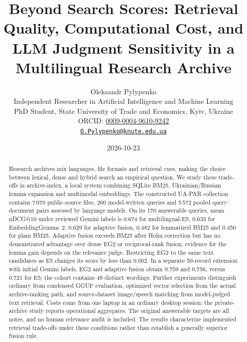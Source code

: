 \documentclass[11pt]{article}
\begin{document}

\title{Beyond Search Scores: Retrieval Quality, Computational Cost, and LLM Judgment Sensitivity in a Multilingual Research Archive}
\author{Oleksandr Pylypenko\\[2pt]\small Independent Researcher in Artificial Intelligence and Machine Learning\\ \small PhD Student, State University of Trade and Economics, Kyiv, Ukraine\\[2pt]
\small ORCID: \href{https://orcid.org/0009-0004-9610-9242}{0009-0004-9610-9242}\\ \small\href{mailto:O.Pylypenko@knute.edu.ua}{\texttt{O.Pylypenko@knute.edu.ua}}}
\date{2026-10-23}
\maketitle

\begin{abstract}
\noindent
Research archives mix languages, file formats and retrieval cues, making the choice between lexical, dense and hybrid search an empirical question. We study these trade-offs in archive-index, a local system combining SQLite BM25, Ukrainian/Russian lemma expansion and multimodal embeddings. The constructed UA-PAR collection contains 7\,070 public-source files, 200 model-written queries and 5\,572 pooled query--document pairs assessed by language models. On its 170 answerable queries, mean nDCG@10 under reviewed Gemini labels is 0.674 for multilingual-E5, 0.633 for EmbeddingGemma~2, 0.629 for adaptive fusion, 0.482 for lemmatized BM25 and 0.450 for plain BM25. Adaptive fusion exceeds BM25 after Holm correction but has no demonstrated advantage over dense EG2 or reciprocal-rank fusion; evidence for the lemma gain depends on the relevance judge. Restricting EG2 to the same text candidates as E5 changes its score by less than 0.002. In a separate 50-record extension with initial Gemini labels, EG2 and adaptive fusion obtain 0.759 and 0.756, versus 0.721 for E5; the cohort contains 49 distinct wordings. Further experiments distinguish ordinary from condensed GGUF evaluation, optimized vector selection from the actual archive-ranking path, and source-dataset image/speech matching from model-judged text retrieval. Costs come from one laptop in an ordinary desktop session; the private-archive study reports operational aggregates. The original answerable targets are all notes, and no human relevance audit is included. The results characterize implemented retrieval trade-offs under these conditions rather than establish a generally superior fusion rule.
\end{abstract}
\end{document}
